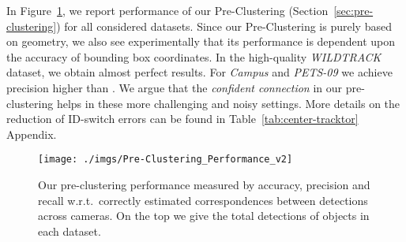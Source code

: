 In Figure~\ref{fig:result-2Dclustering}, we report performance of our Pre-Clustering (Section~\ref{sec:pre-clustering}) for all considered datasets.
Since our Pre-Clustering is purely based on geometry, we also see experimentally that its performance is dependent upon the accuracy of bounding box coordinates.
In the high-quality \textit{WILDTRACK} dataset, we obtain almost perfect results.
For \textit{Campus} and \textit{PETS-09} we achieve precision higher than .
We argue that the \textit{confident connection} in our pre-clustering helps in these more challenging and noisy settings.
More details on the reduction of ID-switch errors can be found in Table~\ref{tab:center-tracktor} Appendix.
\vspace{-0.15in}
\begin{figure}[!hbt]
\centering
\texttt{[image: ./imgs/Pre-Clustering\_Performance\_v2]}
\vspace{-0.15in}
\caption{Our pre-clustering performance measured by accuracy, precision and recall w.r.t.\ correctly estimated correspondences between detections across cameras. On the top we give the total detections of objects in each dataset.
}
\label{fig:result-2Dclustering}
\vspace{-0.2in}
\end{figure}

